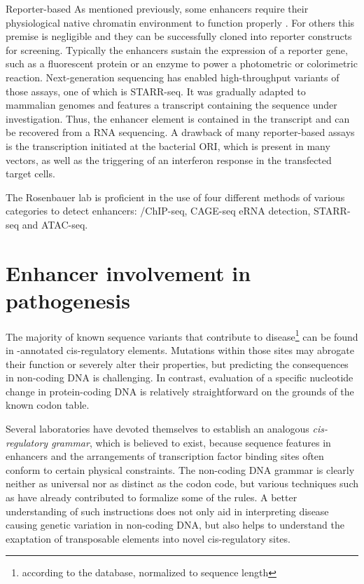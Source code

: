 \begin{mydescription}{0.5cm}
	\item[Reporter-based] As mentioned previously, some enhancers require their physiological native chromatin environment to function properly \cite{Inoue2016}. For others this premise is negligible and they can be successfully cloned into reporter constructs for screening. Typically the enhancers sustain the expression of a reporter gene, such as a fluorescent protein or an enzyme to power a photometric or colorimetric reaction. Next-generation sequencing has enabled high-throughput variants of those assays, one of which is STARR-seq\cite{Arnold2013}. It was gradually adapted to mammalian genomes\cite{Vanhille2015,Liu2017} and features a transcript containing the sequence under investigation. Thus, the enhancer element is contained in the transcript and can be recovered from a RNA sequencing. A drawback of many reporter-based assays is the transcription initiated at the bacterial ORI\cite{Lemp2012}, which is present in many vectors, as well as the triggering of an interferon response in the transfected target cells\cite{Muerdter2018}.
\end{mydescription}

The Rosenbauer lab is proficient in the use of four different methods of various categories to detect enhancers: \hisfourone/\histwentysevenac ChIP-seq, CAGE-seq eRNA detection, STARR-seq and ATAC-seq. 

\section{Enhancer involvement in pathogenesis}
\label{chap:i:enhancers:pathogenesis}

The majority of known sequence variants that contribute to disease\footnote{according to the  database, normalized to sequence length} can be found in -annotated cis-regulatory elements. Mutations within those sites may abrogate their function or severely alter their properties, but predicting the consequences in non-coding DNA is challenging\cite{Kwasnieski2012,Tewhey2016}. In contrast, evaluation of a specific nucleotide change in protein-coding DNA is relatively straightforward on the grounds of the known codon table.

Several laboratories have devoted themselves to establish an analogous \emph{cis-regulatory grammar}\cite{White2015}, which is believed to exist, because sequence features in enhancers and the arrangements of transcription factor binding sites often conform to certain physical constraints\cite{Zeigler2014}. The non-coding DNA grammar is clearly neither as universal nor as distinct as the codon code, but various techniques such as \cite{Sherman2012} have already contributed to formalize some of the rules. A better understanding of such instructions does not only aid in interpreting disease causing genetic variation in non-coding DNA, but also helps to understand the exaptation of transposable elements into novel cis-regulatory sites\cite{Souza2013,Long2016}. 

